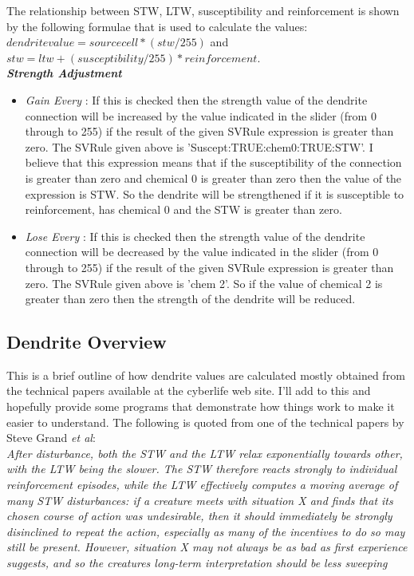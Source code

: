 \documentclass[11pt,twoside,a4paper]{article}
\begin{document}
The relationship between STW, LTW, susceptibility and reinforcement is shown by the following formulae that is used to calculate the values: 
$dendrite value = source cell * ( stw / 255 )$ and $stw = ltw + ( susceptibility / 255 ) * reinforcement$.~\\

\textbf{\textit{Strength Adjustment}}
\begin{itemize}
	\item[] \emph{Gain Every} : If this is checked then the strength value of the dendrite connection will be increased by the value indicated in the slider (from 0 through to 255) if the result of the given SVRule expression is greater than zero. The SVRule given above is 'Suscept:TRUE:chem0:TRUE:STW'. I believe that this expression means that if the susceptibility of the connection is greater than zero and chemical 0 is greater than zero then the value of the expression is STW. So the dendrite will be strengthened if it is susceptible to reinforcement, has chemical 0 and the STW is greater than zero.
	\item[] \emph{Lose Every} : If this is checked then the strength value of the dendrite connection will be decreased by the value indicated in the slider (from 0 through to 255) if the result of the given SVRule expression is greater than zero. The SVRule given above is 'chem 2'. So if the value of chemical 2 is greater than zero then the strength of the dendrite will be reduced.
\end{itemize}

\subsection{Dendrite Overview}

This is a brief outline of how dendrite values are calculated mostly obtained from the technical papers available at the cyberlife web site. I'll add to this and hopefully provide some programs that demonstrate how things work to make it easier to understand. The following is quoted from one of the technical papers by Steve Grand \textit{et al}:~\\


\emph{After disturbance, both the STW and the LTW relax exponentially towards other, with the LTW being the slower. The STW therefore reacts strongly to individual reinforcement episodes, while the LTW effectively computes a moving average of many STW disturbances: if a creature meets with situation X and finds that its chosen course of action was undesirable, then it should immediately be strongly disinclined to repeat the action, especially as many of the incentives to do so may still be present. However, situation X may not always be as bad as first experience suggests, and so the creatures long-term interpretation should be less sweeping}~\\
\end{document}
